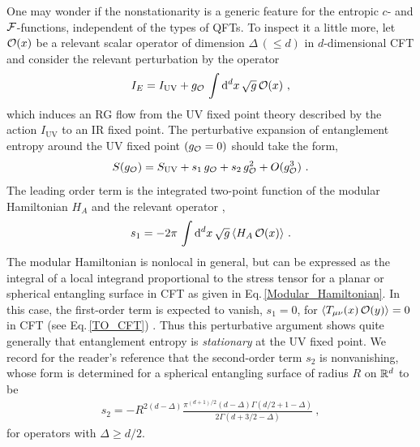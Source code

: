 One may wonder if the nonstationarity is a generic feature for the entropic $c$- and ${\cal F}$-functions, independent of the types of QFTs.
To inspect it a little more, let ${\cal O}(x)$ be a relevant scalar operator of dimension $\Delta\, (\le d)$ in $d$-dimensional CFT and consider the relevant perturbation by the operator
\begin{align}
	I_E = I_\text{UV} + g_{\cal O}\, \int \mathrm{d}^d x\,\sqrt{g}\,{\cal O}(x) \ ,
\end{align}
which induces an RG flow from the UV fixed point theory described by the action $I_\text{UV}$ to an IR fixed point.
The perturbative expansion of entanglement entropy around the UV fixed point $(g_{\cal O} =0)$ should take the form,
\begin{align}\label{CP_EE}
	S (g_\CO) = S_\text{UV} + s_1\, g_\CO + s_2\,g_\CO^2 + O(g_\CO^3) \ .
\end{align}
The leading order term is the integrated two-point function of the modular Hamiltonian $H_A$ and the relevant operator \cite{Rosenhaus:2014woa,Rosenhaus:2014zza},
\begin{align}\label{s1}
	s_1 = - 2\pi\,\int \d^d x\,\sqrt{g}\, \langle H_A\, \CO(x)\rangle \ . 
\end{align}
The modular Hamiltonian is nonlocal in general, but can be expressed as the integral of a local integrand proportional to the stress tensor for a planar or spherical entangling surface in CFT as given in Eq.\,\eqref{Modular_Hamiltonian}.
In this case, the first-order term is expected to vanish, $s_1=0$, for $\langle T_{\mu\nu}(x)\,{\cal O}(y)\rangle = 0$ in CFT (see Eq.\,\eqref{TO_CFT}) \cite{Rosenhaus:2014woa}.
Thus this perturbative argument shows quite generally that entanglement entropy is \emph{stationary} at the UV fixed point.
We record for the reader's reference that the second-order term $s_2$ is nonvanishing, whose form is determined for a spherical entangling surface of radius $R$ on $\mathbb{R}^d$ to be \cite{Faulkner:2014jva}
\begin{align}
	s_2 = - R^{2(d-\Delta)} \frac{\pi^{(d+1)/2}(d - \Delta)\Gamma\left( d/2+1 - \Delta\right)}{2\Gamma \left( d+ 3/2 - \Delta\right)} \ ,
\end{align}
for operators with $\Delta \ge d/2$.

